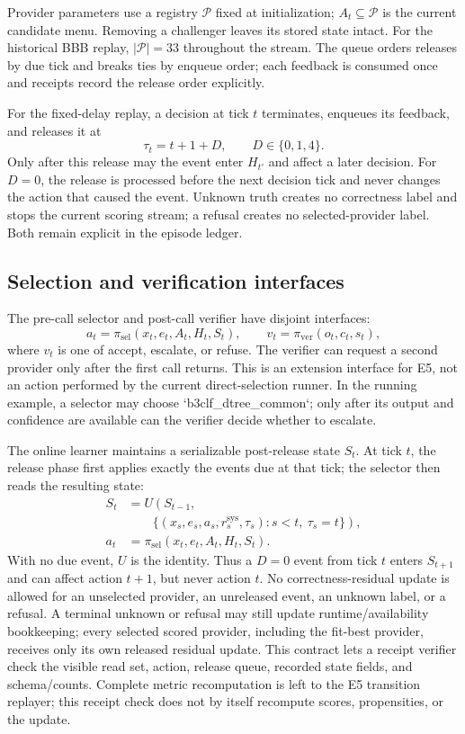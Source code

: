 \documentclass[sigconf,anonymous]{aamas}
\begin{document}
Provider parameters use a registry $\mathcal P$ fixed at initialization; $A_t\subseteq\mathcal P$ is the current candidate menu. Removing a challenger leaves its stored state intact. For the historical BBB replay, $|\mathcal P|=33$ throughout the stream. The queue orders releases by due tick and breaks ties by enqueue order; each feedback is consumed once and receipts record the release order explicitly.

For the fixed-delay replay, a decision at tick $t$ terminates, enqueues its feedback, and releases it at
$$
\tau_t=t+1+D,\qquad D\in\{0,1,4\}.
$$
Only after this release may the event enter $H_{t'}$ and affect a later decision. For $D=0$, the release is processed before the next decision tick and never changes the action that caused the event. Unknown truth creates no correctness label and stops the current scoring stream; a refusal creates no selected-provider label. Both remain explicit in the episode ledger.

\subsection{Selection and verification interfaces}
The pre-call selector and post-call verifier have disjoint interfaces:
$$
a_t=\pi_{\mathrm{sel}}(x_t,e_t,A_t,H_t,S_t),\qquad v_t=\pi_{\mathrm{ver}}(o_t,c_t,s_t),
$$
where $v_t$ is one of accept, escalate, or refuse. The verifier can request a second provider only after the first call returns. This is an extension interface for E5, not an action performed by the current direct-selection runner. In the running example, a selector may choose `b3clf\_dtree\_common`; only after its output and confidence are available can the verifier decide whether to escalate.

The online learner maintains a serializable post-release state $S_t$. At tick $t$, the release phase first applies exactly the events due at that tick; the selector then reads the resulting state:
$$
\begin{aligned}
S_t&=U\left(S_{t-1},\right.\\[-2pt]
&\qquad\left.\{(x_s,e_s,a_s,r_s^{\mathrm{sys}},\tau_s):s<t,\ \tau_s=t\}\right),\\
a_t&=\pi_{\mathrm{sel}}(x_t,e_t,A_t,H_t,S_t).
\end{aligned}
$$
With no due event, $U$ is the identity. Thus a $D=0$ event from tick $t$ enters $S_{t+1}$ and can affect action $t+1$, but never action $t$.
No correctness-residual update is allowed for an unselected provider, an unreleased event, an unknown label, or a refusal. A terminal unknown or refusal may still update runtime/availability bookkeeping; every selected scored provider, including the fit-best provider, receives only its own released residual update. This contract lets a receipt verifier check the visible read set, action, release queue, recorded state fields, and schema/counts. Complete metric recomputation is left to the E5 transition replayer; this receipt check does not by itself recompute scores, propensities, or the update.
\end{document}

